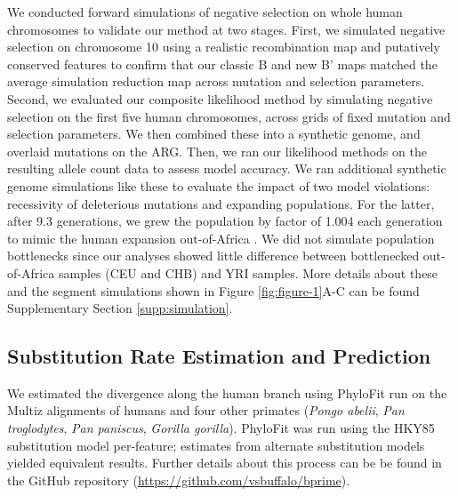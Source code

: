 \documentclass[11pt]{article}
\begin{document}
We conducted forward simulations of negative selection on whole human
chromosomes to validate our method at two stages. First, we simulated negative
selection on chromosome 10 using a realistic recombination map and putatively
conserved features to confirm that our classic B and new B' maps matched the
average simulation reduction map across mutation and selection parameters.
Second, we evaluated our composite likelihood method by simulating negative
selection on the first five human chromosomes, across grids of fixed mutation
and selection parameters. We then combined these into a synthetic genome, and
overlaid mutations on the ARG. Then, we ran our likelihood methods on the
resulting allele count data to assess model accuracy. We ran additional
synthetic genome simulations like these to evaluate the impact of two model
violations: recessivity of deleterious mutations and expanding populations. For
the latter, after $9.3$ generations, we grew the population by factor of 1.004
each generation to mimic the human expansion out-of-Africa
\parencite{Gutenkunst2009-pg}. We did not simulate population bottlenecks since
our analyses showed little difference between bottlenecked out-of-Africa
samples (CEU and CHB) and YRI samples. More details about these and the segment
simulations shown in Figure \ref{fig:figure-1}A-C can be found Supplementary
Section \ref{supp:simulation}.

\subsection*{Substitution Rate Estimation and Prediction}
\label{sec:methods-sub}

We estimated the divergence along the human branch using PhyloFit
\parencite{Siepel2004-ql} run on the Multiz alignments
\parencite{Blanchette2004-bb} of humans and four other primates (\emph{Pongo
abelii}, \emph{Pan troglodytes}, \emph{Pan paniscus}, \emph{Gorilla gorilla}).
PhyloFit was run using the HKY85 substitution model per-feature; estimates from
alternate substitution models yielded equivalent results. Further details about
this process can be be found in the GitHub repository
(\url{https://github.com/vsbuffalo/bprime}).

\printbibliography
\end{document}
